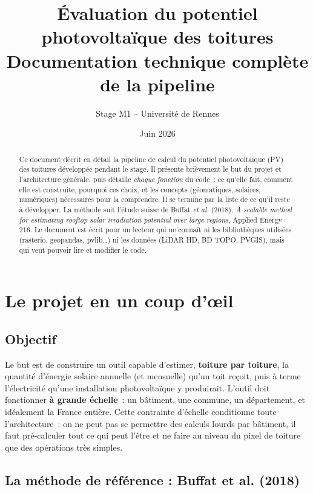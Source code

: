 \documentclass[11pt,a4paper]{article}
\title{Évaluation du potentiel photovoltaïque des toitures\\
       \large Documentation technique complète de la pipeline}
\author{Stage M1 -- Université de Rennes}
\date{Juin 2026}
\begin{document}
\maketitle

\begin{abstract}
Ce document décrit en détail la pipeline de calcul du potentiel photovoltaïque
(PV) des toitures développée pendant le stage. Il présente brièvement le but du
projet et l'architecture générale, puis détaille \emph{chaque fonction} du code~:
ce qu'elle fait, comment elle est construite, pourquoi ces choix, et les concepts
(géomatiques, solaires, numériques) nécessaires pour la comprendre. Il se termine
par la liste de ce qu'il reste à développer. La méthode suit l'étude suisse de
Buffat \emph{et al.} (2018), \emph{A scalable method for estimating rooftop solar
irradiation potential over large regions}, Applied Energy 216.
Le document est écrit pour un lecteur qui ne connaît ni les bibliothèques
utilisées (rasterio, geopandas, pvlib\ldots) ni les données (LiDAR HD, BD TOPO,
PVGIS), mais qui veut pouvoir lire et modifier le code.
\end{abstract}

\tableofcontents
\newpage

\section{Le projet en un coup d'œil}

\subsection{Objectif}

Le but est de construire un outil capable d'estimer, \textbf{toiture par
toiture}, la quantité d'énergie solaire annuelle (et mensuelle) qu'un toit
reçoit, puis à terme l'électricité qu'une installation photovoltaïque y
produirait. L'outil doit fonctionner \textbf{à grande échelle}~: un bâtiment,
une commune, un département, et idéalement la France entière. Cette contrainte
d'échelle conditionne toute l'architecture~: on ne peut pas se permettre des
calculs lourds par bâtiment, il faut pré-calculer tout ce qui peut l'être et ne
faire au niveau du pixel de toiture que des opérations très simples.

\subsection{La méthode de référence : Buffat et al. (2018)}
\end{document}
